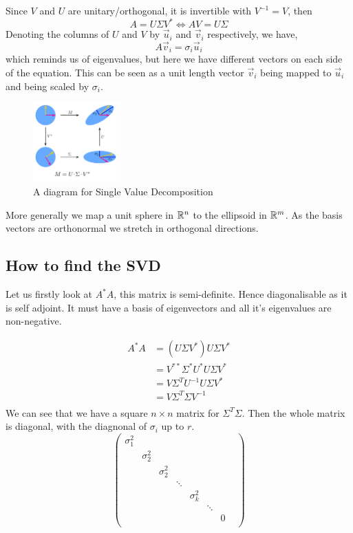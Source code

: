 \documentclass{article}
\begin{document}
Since $V$ and $U$ are unitary/orthogonal, it is invertible with $V^{-1} = V$, then
$$ A = U\Sigma V^* \iff AV = U\Sigma $$
Denoting the columns of $U$ and $V$ by $\vec u_i$ and $\vec v_i$ respectively, we have,
$$ A\vec v_i = \sigma_i\vec u_i $$
which reminds us of eigenvalues, but here we have different vectors on each side of the equation. This can be seen as a unit length vector $\vec v_i$ being mapped to $\vec u_i$ and being scaled by $\sigma_i$.\\

\begin{figure}[!ht]
  \centering
  \includegraphics[width = 0.3\textwidth]{./figures/SVD.png}
  \caption{A diagram for Single Value Decomposition}
  \label{}
\end{figure}

More generally we map a unit sphere in $\mathbb{R}^n$ to the ellipsoid in $\mathbb{R}^m$. As the basis vectors are orthonormal we stretch in orthogonal directions.

\subsection{How to find the SVD}

Let us firstly look at $A^*A$, this matrix is semi-definite. Hence diagonalisable as it is self adjoint. It must have a basis of eigenvectors and all it's eigenvalues are non-negative.

\begin{align*}
  A^*A &= (U\Sigma V^*)U\Sigma V^*\\
  &= V^{**}\Sigma^*U^*U\Sigma V^*\\
  &= V\Sigma^TU^{-1}U\Sigma V^*\\
  &= V\Sigma^T\Sigma V^{-1}\\
\end{align*}
We can see that we have a square $n\times n$ matrix for $\Sigma^T\Sigma$. Then the whole matrix is diagonal, with the diagnonal of $\sigma_i$ up to $r$.
$$ \begin{pmatrix}
  \sigma_1^2 & & & & &\\
  & \sigma_2^2 & & & &\\
  &  & \sigma_2^2 & & &\\
  & & & \ddots & & & &\\
  & & & & \sigma_k^2 & &\\
  & & & & & \ddots & &\\
  & & & & & & 0 & \\
\end{pmatrix} $$
\end{document}
